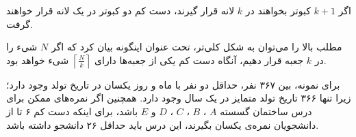 
\begin{DEFINITION}
    \p
    اگر 
    $k+1$
    کبوتر  بخواهند در 
    $k$
    لانه قرار گیرند، دست کم دو کبوتر در یک لانه قرار خواهند گرفت.
\end{DEFINITION}

\begin{THEOREM}
    \p
    مطلب بالا را می‌توان به شکل کلی‌تر، تحت عنوان
    اینگونه بیان کرد که
    اگر 
    $N$
    شیء را در 
    $k$
    جعبه قرار دهیم، آنگاه دست کم یکی از جعبه‌ها دارای
    $\left \lceil \frac{N}{k} \right \rceil$
    شیء خواهد بود.
\end{THEOREM}
\p
برای نمونه،
بین ۳۶۷ نفر، حداقل دو نفر با ماه و روز یکسان در تاریخ تولد وجود دارد؛ زیرا تنها ۳۶۶ تاریخ تولد متمایز در یک سال وجود دارد.
همچنین اگر نمره‌های ممکن برای درس ساختمان گسسته 
$A$
، 
$B$
، 
$C$
، 
$D$
و
$E$
باشد، برای اینکه دست کم ۶ تا از دانشجویان نمره‌ی یکسان بگیرند، این درس باید حداقل ۲۶ دانشجو داشته باشد.




\begin{PROBLEM}
    

\end{PROBLEM}
